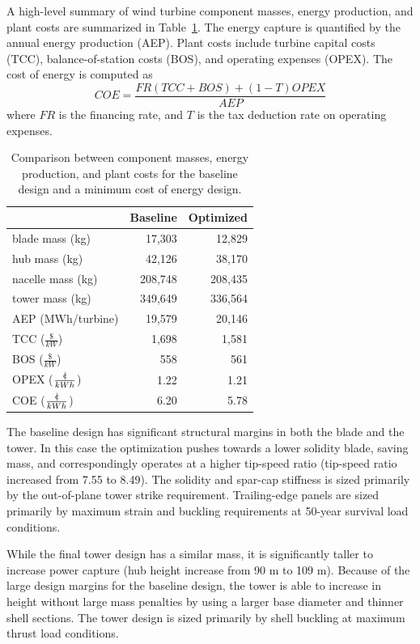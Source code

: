 \documentclass[]{aiaa-tc} %
\newcommand{\cent}{{\mathrm{c}\mkern-6.5mu{\mid}}}
\begin{document}
    A high-level summary of wind turbine component masses, energy production, and plant costs are summarized in Table~\ref{tab:wind_results}.  The energy capture is quantified by the annual energy production (AEP).  Plant costs include turbine capital costs (TCC), balance-of-station costs (BOS), and operating expenses (OPEX).  The cost of energy is computed as
    \begin{equation}
    COE = \frac {FR (TCC + BOS) + (1-T) OPEX} {AEP}
    \end{equation}
    where $FR$ is the financing rate, and $T$ is the tax deduction rate on operating expenses.

    \begin{table}[htb]
    \centering
    \caption{Comparison between component masses, energy production, and plant costs for the baseline design and a minimum cost of energy design.}
    \label{tab:wind_results}
    \begin{tabular}{@{}lrr@{}}
    \toprule
     &  Baseline & Optimized  \\
    \midrule
    blade mass (kg) & 17,303 & 12,829  \\
    hub mass (kg) & 42,126 & 38,170  \\
    nacelle mass (kg) & 208,748 & 208,435  \\
    tower mass (kg) & 349,649 & 336,564  \\
    AEP (MWh/turbine) &  19,579 & 20,146  \\
    TCC ($\frac{\$}{kW}$) &  1,698 & 1,581  \\
    BOS ($\frac{\$}{kW}$) &  558 & 561  \\
    OPEX ($\frac{\cent}{kWh}$) &  1.22 & 1.21  \\
    COE ($\frac{\cent}{kWh}$) &  6.20 & 5.78  \\
    \bottomrule
    \end{tabular}
    \end{table}

      The baseline design has significant structural margins in both the blade and the tower.  In this case the optimization pushes towards a lower solidity blade, saving mass, and correspondingly operates at a higher tip-speed ratio (tip-speed ratio increased from 7.55 to 8.49).  The solidity and spar-cap stiffness is sized primarily by the out-of-plane tower strike requirement.  Trailing-edge panels are sized primarily by maximum strain and buckling requirements at 50-year survival load conditions.

      While the final tower design has a similar mass, it is significantly taller to increase power capture (hub height increase from 90 m to 109 m).  Because of the large design margins for the baseline design, the tower is able to increase in height without large mass penalties by using a larger base diameter and thinner shell sections.  The tower design is sized primarily by shell buckling at maximum thrust load conditions.
\end{document}
